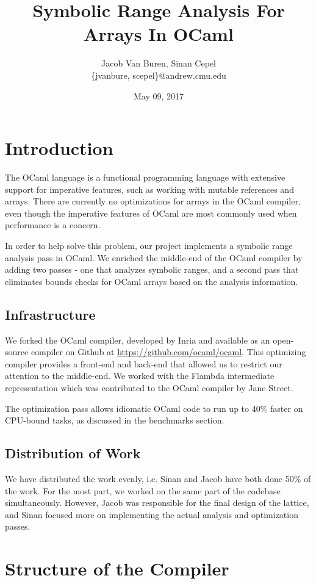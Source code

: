 \documentclass[11pt]{article}
\title{Symbolic Range Analysis For Arrays In OCaml}
\date{May 09, 2017}
\author{Jacob Van Buren, Sinan Cepel \\ \{jvanbure, scepel\}@andrew.cmu.edu}
\begin{document}
\maketitle

\section{Introduction}

The OCaml language is a functional programming language with extensive support for imperative features, such as working with mutable references and arrays. There are currently no optimizations for arrays in the OCaml compiler, even though the imperative features of OCaml are most commonly used when performance is a concern.

In order to help solve this problem, our project implements a symbolic range analysis pass in OCaml. We enriched the middle-end of the OCaml compiler by adding two passes - one that analyzes symbolic ranges, and a second pass that eliminates bounds checks for OCaml arrays based on the analysis information.


\subsection{Infrastructure}

We forked the OCaml compiler, developed by Inria and available as an open-source compiler on Github at \url{https://github.com/ocaml/ocaml}. This optimizing compiler provides a front-end and back-end that allowed us to restrict our attention to the middle-end. We worked with the Flambda intermediate representation which was contributed to the OCaml compiler by Jane Street.

The optimization pass allows idiomatic OCaml code to run up to 40\% faster on CPU-bound tasks, as discussed in the benchmarks section. 

\subsection{Distribution of Work}

We have distributed the work evenly, i.e. Sinan and Jacob have both done 50\% of the work. For the most part, we worked on the same part of the codebase simultaneously. However, Jacob was responsible for the final design of the lattice, and Sinan focused more on implementing the actual analysis and optimization passes.

\section{Structure of the Compiler}
\end{document}

